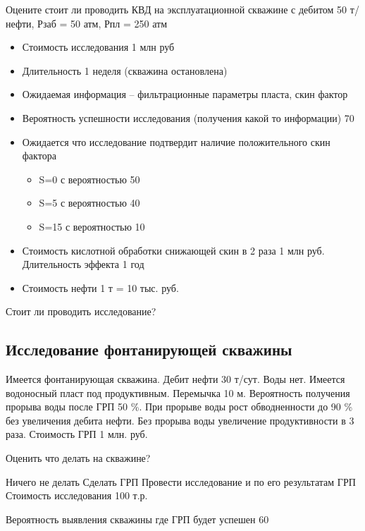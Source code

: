 Оцените стоит ли проводить КВД на эксплуатационной скважине с дебитом 50 т/нефти, Рзаб = 50 атм, Рпл = 250 атм
\begin{itemize}
    \item Стоимость исследования 1 млн руб
    \item Длительность 1 неделя (скважина остановлена)
    \item Ожидаемая информация – фильтрационные параметры пласта, скин фактор
    \item Вероятность успешности исследования (получения какой то информации) 70%
    \item Ожидается что исследование подтвердит наличие положительного скин фактора
    \begin{itemize}
        \item S=0 с вероятностью 50%
        \item S=5 с вероятностью 40%
        \item S=15 с вероятностью 10%
    \end{itemize}
    \item Стоимость кислотной обработки снижающей скин в 2 раза 1 млн руб. Длительность эффекта 1 год
    \item Стоимость нефти 1 т = 10 тыс. руб.
\end{itemize}
Стоит ли проводить исследование? 

\subsection{Исследование фонтанирующей скважины}
Имеется фонтанирующая скважина. Дебит нефти 30 т/сут. Воды нет. Имеется водоносный пласт под продуктивным. Перемычка 10 м. Вероятность получения прорыва воды после ГРП 50 \%. При прорыве воды рост обводненности до 90 \% без увеличения дебита нефти. Без прорыва воды увеличение продуктивности в 3 раза. Стоимость ГРП 1 млн. руб.

Оценить что делать на скважине?

Ничего не делать
Сделать ГРП
Провести исследование и по его результатам ГРП
Стоимость исследования 100 т.р.

Вероятность выявления скважины где ГРП будет успешен 60%
